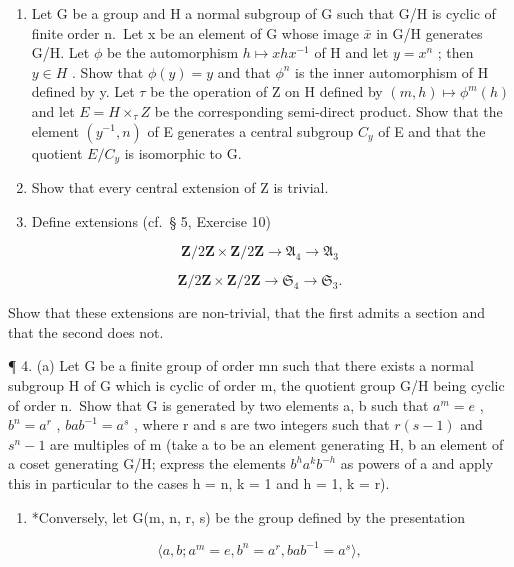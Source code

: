\begin{enumerate}
\def\labelenumi{\arabic{enumi}.}
\item
  Let G be a group and H a normal subgroup of G such that G/H is cyclic of finite order n.~Let x be an element of G whose image \(\bar{x}\) in G/H generates G/H. Let \(\phi\) be the automorphism \(h \mapsto xhx^{-1}\) of H and let \(y = x^{n}\) ; then \(y \in H\) . Show that \(\phi(y) = y\) and that \(\phi^{n}\) is the inner automorphism of H defined by y. Let \(\tau\) be the operation of Z on H defined by \((m, h) \mapsto \phi^{m}(h)\) and let \(E = H \times_{\tau} Z\) be the corresponding semi-direct product. Show that the element \((y^{-1}, n)\) of E generates a central subgroup \(C_{y}\) of E and that the quotient \(E/C_{y}\) is isomorphic to G.
\item
  Show that every central extension of Z is trivial.
\item
  Define extensions (cf.~§ 5, Exercise 10)
\end{enumerate}

\[
\mathbf {Z} / 2 \mathbf {Z} \times \mathbf {Z} / 2 \mathbf {Z} \rightarrow \mathfrak {A} _ {4} \rightarrow \mathfrak {A} _ {3}
\]

\[
\mathbf {Z} / 2 \mathbf {Z} \times \mathbf {Z} / 2 \mathbf {Z} \rightarrow \mathfrak {S} _ {4} \rightarrow \mathfrak {S} _ {3}.
\]

Show that these extensions are non-trivial, that the first admits a section and that the second does not.

¶ 4. (a) Let G be a finite group of order mn such that there exists a normal subgroup H of G which is cyclic of order m, the quotient group G/H being cyclic of order n.~Show that G is generated by two elements a, b such that \(a^{m} = e\) , \(b^{n} = a^{r}\) , \(bab^{-1} = a^{s}\) , where r and s are two integers such that \(r(s - 1)\) and \(s^{n} - 1\) are multiples of m (take a to be an element generating H, b an element of a coset generating G/H; express the elements \(b^{h}a^{k}b^{-h}\) as powers of a and apply this in particular to the cases h = n, k = 1 and h = 1, k = r).

\begin{enumerate}
\def\labelenumi{(\alph{enumi})}
\setcounter{enumi}{1}
\tightlist
\item
  *Conversely, let G(m, n, r, s) be the group defined by the presentation
\end{enumerate}

\[
\langle a, b; a ^ {m} = e, b ^ {n} = a ^ {r}, b a b ^ {- 1} = a ^ {s} \rangle ,
\]

